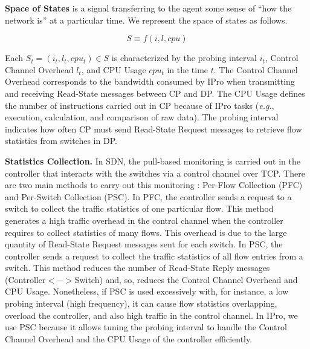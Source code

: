 \textbf{Space of States} is a signal transferring to the agent some sense of ``how the network is'' at a particular time. We represent the space of states as follows.

\begin{equation}
      S\equiv f \left ( i, l, cpu \right )
    \label{equ:states_model}
\end{equation}

Each $S_t= \left ( i_t, l_t, cpu_t \right ) \in S$ is characterized by the probing interval $i_t$, Control Channel Overhead $l_t$, and CPU Usage $cpu_t$ in the time $t$. The Control Channel Overhead corresponds to the bandwidth consumed by IPro when transmitting and receiving Read-State messages between CP and DP. The CPU Usage defines the number of instructions carried out in CP because of IPro tasks (\textit{e.g.}, execution, calculation, and comparison of raw data). The probing interval indicates how often CP must send Read-State Request messages to retrieve flow statistics from switches in DP.

\textbf{Statistics Collection.} In SDN, the pull-based monitoring is carried out in the controller that interacts with the switches via a control channel over TCP. There are two main methods to carry out this monitoring \cite{xu_2017:wildcard_requests} \cite{su_2015:cemon}: Per-Flow Collection (PFC) and Per-Switch Collection (PSC). In PFC, the controller sends a request to a switch to collect the traffic statistics of one particular flow. This method generates a high traffic overhead in the control channel when the controller requires to collect statistics of many flows. This overhead is due to the large quantity of Read-State Request messages sent for each switch. In PSC, the controller sends a request to collect the traffic statistics of all flow entries from a switch. This method reduces the number of Read-State Reply messages (Controller$<->$Switch) and, so, reduces the Control Channel Overhead and CPU Usage. Nonetheless, if PSC is used excessively with, for instance, a low probing interval (high frequency), it can cause flow statistics overlapping, overload the controller, and also high traffic in the control channel. In IPro, we use PSC because it allows tuning the probing interval to handle the Control Channel Overhead and the CPU Usage of the controller efficiently.


